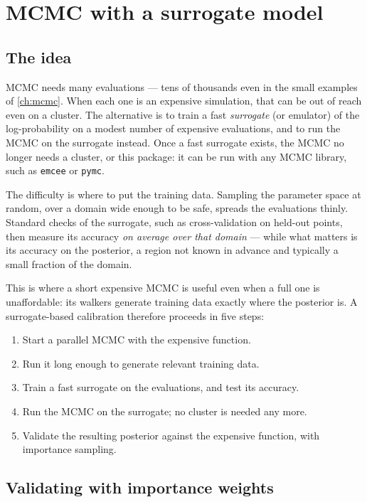 \chapter{MCMC with a surrogate model}
\label{ch:surrogate}

\section{The idea}

MCMC needs many evaluations --- tens of thousands even in the small examples of \cref{ch:mcmc}.
When each one is an expensive simulation, that can be out of reach even on a cluster. The
alternative is to train a fast \emph{surrogate} (or emulator) of the log-probability on a modest
number of expensive evaluations, and to run the MCMC on the surrogate instead. Once a fast surrogate
exists, the MCMC no longer needs a cluster, or this package: it can be run with any MCMC library,
such as \texttt{emcee} or \texttt{pymc}.

The difficulty is where to put the training data. Sampling the parameter space at random, over a
domain wide enough to be safe, spreads the evaluations thinly. Standard checks of the surrogate,
such as cross-validation on held-out points, then measure its accuracy \emph{on average over that
domain} --- while what matters is its accuracy on the posterior, a region not known in advance and
typically a small fraction of the domain.

This is where a short expensive MCMC is useful even when a full one is unaffordable: its walkers
generate training data exactly where the posterior is. A surrogate-based calibration therefore
proceeds in five steps:

\begin{enumerate}[leftmargin=*, label=\textbf{\arabic*.}]
  \item Start a parallel MCMC with the expensive function.
  \item Run it long enough to generate relevant training data.
  \item Train a fast surrogate on the evaluations, and test its accuracy.
  \item Run the MCMC on the surrogate; no cluster is needed any more.
  \item Validate the resulting posterior against the expensive function, with importance sampling.
\end{enumerate}

\section{Validating with importance weights}
\label{sec:importance}


